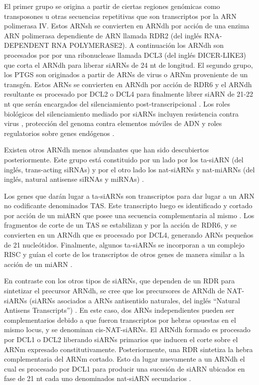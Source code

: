 El primer grupo se origina a partir de ciertas regiones genómicas como transposones u otras secuencias repetitivas que son transcriptos por la ARN polimerasa IV.
Estos ARNsh se convierten en ARNdh por acción de una enzima ARN polimerasa dependiente de ARN llamada RDR2 (del inglés RNA-DEPENDENT RNA POLYMERASE2). 
A continuación los ARNdh son procesados por por una ribonuclease llamada DCL3 (del inglés DICER-LIKE3) que corta el ARNdh para liberar siARNs de 24 nt de longitud.
El segundo grupo, los PTGS son originados a partir de ARNs de virus o ARNm proveniente de un transgén. 
Estos ARNs se convierten en ARNdh por acción de RDR6 y el ARNdh resultante es procesado por DCL2 o DCL4 para finalmente librer siARN de 21-22 nt que serán encargados del silenciamiento post-transcripcional \citep{pmid18358247}.
Los roles biológicos del silenciamiento mediado por siARNs incluyen resistencia contra virus \citep{pmid11485817}, protección del genoma contra elementos móviles de ADN y roles regulatorios sobre genes endógenos \citep{pmid15372043, pmid17943195, Voinnet2009669}.

Existen otros ARNdh menos abundantes que han sido descubiertos posteriormente.
Este grupo está constituido por un lado por los ta-siARN (del inglés, trans-acting siRNAs) y por el otro lado los nat-siARNs y nat-miARNs (del inglés, natural antisense siRNAs y miRNAs) \citep{pmid17943195, pmid18501663, pmid16600909,Voinnet2009669}.

Los genes que darán lugar a ta-siARNs son transcriptos para dar lugar a un ARN no codificante denominados TAS.
Este transcripto luego es identificado y cortado por acción de un miARN que posee una secuencia complementaria al mismo \citep{Allen2005207}.
Los fragmentos de corte de un TAS se estabilizan y por la acción de RDR6, y se convierten en un ARNdh que es procesado por DCL4, generando ARNs pequeños de 21 nucleótidos.
Finalmente, algunos ta-siARNs se incorporan a un complejo RISC y guían el corte de los transcriptos de otros genes de manera similar a la acción de un miARN \citep{Allen2005207,pmid16040244,pmid16131612,Xie2005a}.

En contraste con los otros tipos de siARNs, que dependen de un RDR para sintetizar el precursor ARNdh, se cree que los precursores de ARNdh de NAT-siARNs (siARNs asociados a ARNs antisentido naturales, del inglés ``Natural Antisens Transcripts'') \citep{pmid16377568,pmid17071740}.
En este caso, dos ARNs independientes pueden ser complementarios debido a que fueron transcriptos por hebras opuestas en el mismo locus, y se denominan cis-NAT-siARNs. 
El ARNdh formado es procesado por DCL1 o DCL2 liberando siARNs primarios que inducen el corte sobre el ARNm expresado constitutivamente.
Posteriormente, una RDR sintetiza la hebra complementaria del ARNm cortado. 
Esto da lugar nuevamente a un ARNdh el cual es procesado por DCL1 para producir una sucesión de siARN ubicados en fase de 21 nt cada uno denominados nat-siARN secundarios \citep{pmid16377568,pmid17071740}.

